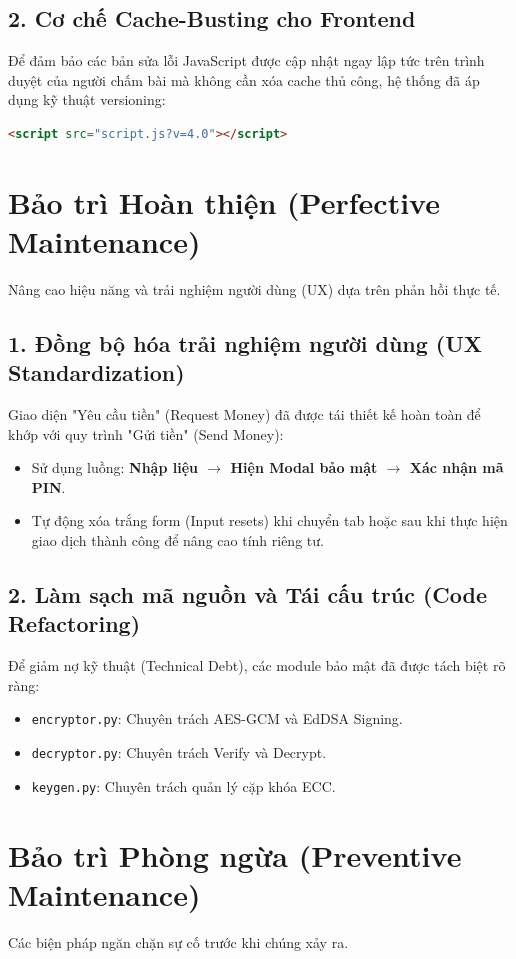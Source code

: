 \documentclass[11pt,a4paper]{article}
\begin{document}
\subsection{2. Cơ chế Cache-Busting cho Frontend}
Để đảm bảo các bản sửa lỗi JavaScript được cập nhật ngay lập tức trên trình duyệt của người chấm bài mà không cần xóa cache thủ công, hệ thống đã áp dụng kỹ thuật versioning:
\begin{lstlisting}[language=html]
<script src="script.js?v=4.0"></script>
\end{lstlisting}

\section{Bảo trì Hoàn thiện (Perfective Maintenance)}
Nâng cao hiệu năng và trải nghiệm người dùng (UX) dựa trên phản hồi thực tế.

\subsection{1. Đồng bộ hóa trải nghiệm người dùng (UX Standardization)}
Giao diện "Yêu cầu tiền" (Request Money) đã được tái thiết kế hoàn toàn để khớp với quy trình "Gửi tiền" (Send Money):
\begin{itemize}
    \item Sử dụng luồng: \textbf{Nhập liệu $\rightarrow$ Hiện Modal bảo mật $\rightarrow$ Xác nhận mã PIN}.
    \item Tự động xóa trắng form (Input resets) khi chuyển tab hoặc sau khi thực hiện giao dịch thành công để nâng cao tính riêng tư.
\end{itemize}

\subsection{2. Làm sạch mã nguồn và Tái cấu trúc (Code Refactoring)}
Để giảm nợ kỹ thuật (Technical Debt), các module bảo mật đã được tách biệt rõ ràng:
\begin{itemize}
    \item \texttt{encryptor.py}: Chuyên trách AES-GCM và EdDSA Signing.
    \item \texttt{decryptor.py}: Chuyên trách Verify và Decrypt.
    \item \texttt{keygen.py}: Chuyên trách quản lý cặp khóa ECC.
\end{itemize}

\section{Bảo trì Phòng ngừa (Preventive Maintenance)}
Các biện pháp ngăn chặn sự cố trước khi chúng xảy ra.
\end{document}
